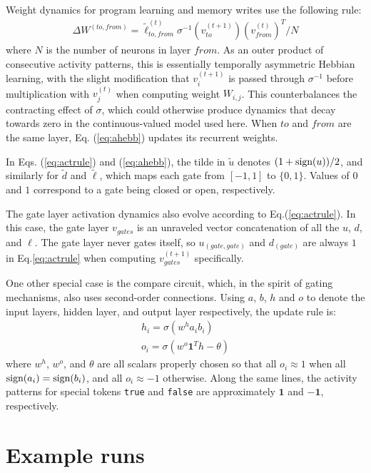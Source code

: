 \documentclass[pdftex,12pt,letterpaper]{article}
\newcommand{\sign}{\text{\upshape{sign}}}
\begin{document}
Weight dynamics for program learning and memory writes use the following rule:
\begin{align}
\Delta W^{(to,from)} = \tilde{\ell}^{(t)}_{to,from}\sigma^{-1}(v^{(t+1)}_{to})(v^{(t)}_{from})^T/N
\label{eq:ahebb}
\end{align}
where $N$ is the number of neurons in layer $from$.  As an outer product of consecutive activity patterns, this is essentially temporally asymmetric Hebbian learning, with the slight modification that $v^{(t+1)}_i$ is passed through $\sigma^{-1}$ before multiplication with $v^{(t)}_j$ when computing weight $W_{i,j}$.  This counterbalances the contracting effect of $\sigma$, which could otherwise produce dynamics that decay towards zero in the continuous-valued model used here.  When $to$ and $from$ are the same layer, Eq. (\ref{eq:ahebb}) updates its recurrent weights.

In Eqs. (\ref{eq:actrule}) and (\ref{eq:ahebb}), the tilde in $\tilde{u}$ denotes $(1+\sign(u))/2$, and similarly for $\tilde{d}$ and $\tilde{\ell}$,  which maps each gate from $[-1,1]$ to $\{0, 1\}$.  Values of $0$ and $1$ correspond to a gate being closed or open, respectively.

The gate layer activation dynamics also evolve according to Eq.\@ (\ref{eq:actrule}).  In this case, the gate layer $v_{gates}$ is an unraveled vector concatenation of all the $u$, $d$, and $\ell$.  The gate layer never gates itself, so $u_{(gate,gate)}$ and $d_{(gate)}$ are always $1$ in Eq.\@ \ref{eq:actrule} when computing $v_{gates}^{(t+1)}$ specifically.

One other special case is the compare circuit, which, in the spirit of gating mechanisms, also uses second-order connections.  Using $a$, $b$, $h$ and $o$ to denote the input layers, hidden layer, and output layer respectively, the update rule is:
\begin{align}
h_i = \sigma\left(w^ha_ib_i\right) \\
o_i = \sigma\left(w^o\textbf{1}^Th - \theta\right)
\end{align}
where $w^h$, $w^o$, and $\theta$ are all scalars properly chosen so that all $o_i \approx 1$ when all $\sign(a_i) = \sign(b_i)$, and all $o_i \approx -1$ otherwise.  Along the same lines, the activity patterns for special tokens \texttt{true} and \texttt{false} are approximately $\mathbf{1}$ and $-\mathbf{1}$, respectively.

\section{Example runs}
\end{document}
